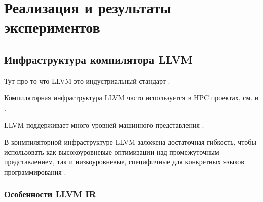 \chapter{Реализация и результаты экспериментов}\label{ch:results}

\section{Инфраструктура компилятора LLVM}\label{sec:results/llvm}

Тут про то что LLVM это индустриальный стандарт \cite{lattner2005llvm}.

Компиляторная инфраструктура LLVM часто используется в HPC проектах, см. \cite{tian2016llvm} и \cite{tian2017llvm}.

LLVM поддерживает много уровней машинного представления \cite{racordon2021asts}.

В конмпиляторной инфраструктуре LLVM заложена достаточная гибкость, чтобы использовать как высокоуровневые оптимизации над промежуточным представлением, так и низкоуровневые, специфичные для конкретных языков программирования \cite{lee2018reconciling}.

\subsection{Особенности LLVM IR}\label{subsec:results/llvm/ir}

